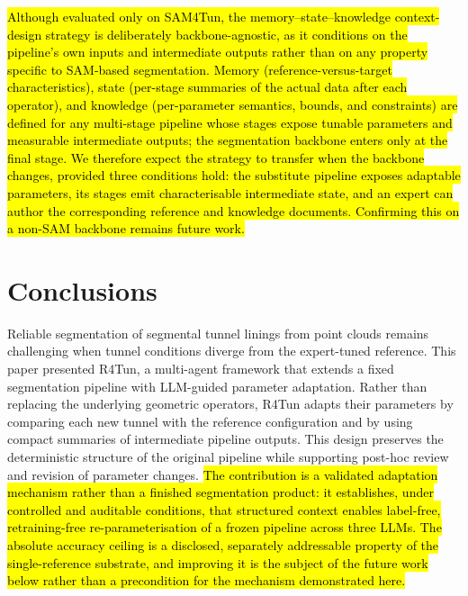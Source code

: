 \documentclass[a4paper,fleqn]{cas-dc}
\begin{document}
{%
\hl{Although evaluated only on SAM4Tun, the memory--state--knowledge context-design strategy is deliberately backbone-agnostic, as it conditions on the pipeline's own inputs and intermediate outputs rather than on any property specific to SAM-based segmentation. Memory (reference-versus-target characteristics), state (per-stage summaries of the actual data after each operator), and knowledge (per-parameter semantics, bounds, and constraints) are defined for any multi-stage pipeline whose stages expose tunable parameters and measurable intermediate outputs; the segmentation backbone enters only at the final stage. We therefore expect the strategy to transfer when the backbone changes, provided three conditions hold: the substitute pipeline exposes adaptable parameters, its stages emit characterisable intermediate state, and an expert can author the corresponding reference and knowledge documents. Confirming this on a non-SAM backbone remains future work.}

\section{Conclusions}\label{sec:conclusions}

Reliable segmentation of segmental tunnel linings from point clouds remains challenging when tunnel conditions diverge from the expert-tuned reference. This paper presented R4Tun, a multi-agent framework that extends a fixed segmentation pipeline with LLM-guided parameter adaptation. Rather than replacing the underlying geometric operators, R4Tun adapts their parameters by comparing each new tunnel with the reference configuration and by using compact summaries of intermediate pipeline outputs. This design preserves the deterministic structure of the original pipeline while supporting post-hoc review and revision of parameter changes. \hl{The contribution is a validated adaptation mechanism rather than a finished segmentation product: it establishes, under controlled and auditable conditions, that structured context enables label-free, retraining-free re-parameterisation of a frozen pipeline across three LLMs. The absolute accuracy ceiling is a disclosed, separately addressable property of the single-reference substrate, and improving it is the subject of the future work below rather than a precondition for the mechanism demonstrated here.}

}
\end{document}
